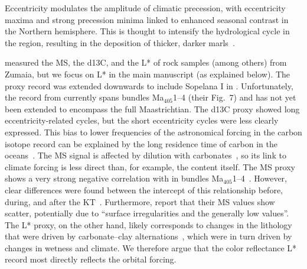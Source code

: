 \documentclass[draft]{agujournal2019}
\newcommand{\ma}[1]{Ma\(_{405}\)#1} %
\begin{document}
Eccentricity modulates the amplitude of climatic precession, with eccentricity maxima and strong precession minima linked to enhanced seasonal contrast in the Northern hemisphere.
This is thought to intensify the hydrological cycle in the region, resulting in the deposition of thicker, darker marls~\cite{Batenburg2014}.

 measured the \gls{MS}, the \gls{d13C}, and the \acrfull{L*} of rock samples (among others) from Zumaia, but we focus on \gls{L*} in the main manuscript (as explained below).
The  proxy record was extended downwards to include Sopelana I in .
Unfortunately, the  record from  currently spans bundles \ma{1--4} (their Fig.~7) and has not yet been extended to encompass the full Maastrichtian.
The \gls{d13C} proxy showed long eccentricity-related cycles, but the short eccentricity cycles were less clearly expressed.
This bias to lower frequencies of the astronomical forcing in the carbon isotope record can be explained by the long residence time of carbon in the oceans~\cite{Zeebe2017,Kocken2019loscar}.
The \gls{MS} signal is affected by dilution with carbonates~\cite{tenKateSprenger1993},
so its link to climate forcing is less direct than, for example, the  content itself.
The \gls{MS} proxy shows a very strong negative correlation with  in bundles \ma{1--4}~\cite{tenKateSprenger1993,Gilabert2022}.
However, clear differences were found between the intercept of this relationship before, during, and after the \gls{KT}~\cite<supplementary figure S2 in>{Gilabert2022}.
Furthermore,  report that their \gls{MS} values show scatter, potentially due to ``surface irregularities and the generally low values''.
The \gls{L*} proxy, on the other hand, likely corresponds to changes in the lithology that were driven by carbonate--clay alternations~\cite{MountWard1986,Batenburg2012},
which were in turn driven by changes in wetness and climate.
We therefore argue that the color reflectance \gls{L*} record most directly reflects the orbital forcing.
\end{document}
